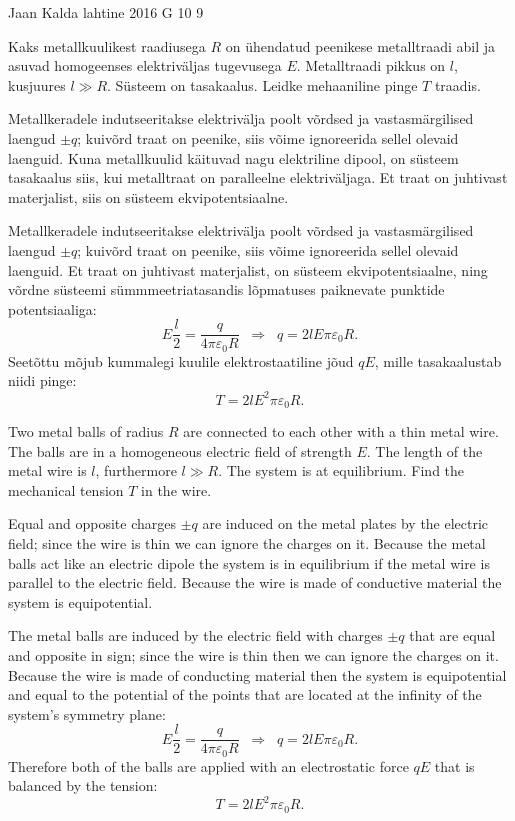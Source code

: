 {Jaan Kalda} %
{lahtine} %
{2016} %
{G 10} %
{9} %
{
\ifStatement
Kaks metallkuulikest raadiusega $R$ on ühendatud peenikese metalltraadi abil ja asuvad  homogeenses 
elektriväljas tugevusega $E$. Metalltraadi pikkus on $l$, kusjuures $l\gg R$. 
Süsteem on tasakaalus. Leidke mehaaniline pinge $T$ traadis.
\fi


\ifHint
Metallkeradele indutseeritakse elektrivälja poolt võrdsed ja vastasmärgilised laengud $\pm q$; kuivõrd traat on peenike,
siis võime ignoreerida sellel olevaid laenguid. Kuna metallkuulid käituvad nagu elektriline dipool, on süsteem tasakaalus siis, kui metalltraat on paralleelne elektriväljaga. Et traat on juhtivast materjalist, siis on süsteem ekvipotentsiaalne.
\fi


\ifSolution
Metallkeradele indutseeritakse elektrivälja poolt võrdsed ja vastasmärgilised laengud $\pm q$; kuivõrd traat on peenike,
siis võime ignoreerida sellel olevaid laenguid. Et traat on juhtivast materjalist, on süsteem ekvipotentsiaalne,
ning võrdne süsteemi sümmmeetriatasandis lõpmatuses paiknevate punktide potentsiaaliga:
$$E\frac l2=\frac q{4\pi\varepsilon_0R}\;\;\Rightarrow\;\; q=2lE\pi\varepsilon_0R.$$
Seetõttu mõjub kummalegi kuulile elektrostaatiline jõud $qE$, mille tasakaalustab niidi pinge:
$$T=2lE^2\pi\varepsilon_0R.$$
\fi


\ifEngStatement
Two metal balls of radius $R$ are connected to each other with a thin metal wire. The balls are in a homogeneous electric field of strength $E$. The length of the metal wire is $l$, furthermore $l\gg R$. The system is at equilibrium. Find the mechanical tension $T$ in the wire.
\fi


\ifEngHint
Equal and opposite charges $\pm q$ are induced on the metal plates by the electric field; since the wire is thin we can ignore the charges on it. Because the metal balls act like an electric dipole the system is in equilibrium if the metal wire is parallel to the electric field. Because the wire is made of conductive material the system is equipotential.
\fi


\ifEngSolution
The metal balls are induced by the electric field with charges $\pm q$ that are equal and opposite in sign; since the wire is thin then we can ignore the charges on it. Because the wire is made of conducting material then the system is equipotential and equal to the potential of the points that are located at the infinity of the system’s symmetry plane:
$$E\frac l2=\frac q{4\pi\varepsilon_0R}\;\;\Rightarrow\;\; q=2lE\pi\varepsilon_0R.$$ 
Therefore both of the balls are applied with an electrostatic force $qE$ that is balanced by the tension:
$$T=2lE^2\pi\varepsilon_0R.$$
\fi
}